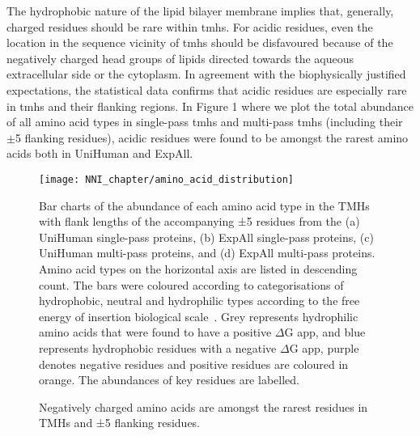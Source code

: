 The hydrophobic nature of the lipid bilayer membrane implies that, generally, charged residues should be rare within \gls{tmh}s. For acidic residues, even the location in the sequence vicinity of \gls{tmh}s should be disfavoured because of the negatively charged head groups of lipids directed towards the aqueous extracellular side or the cytoplasm. In agreement with the biophysically justified expectations, the statistical data confirms that acidic residues are especially rare in \gls{tmh}s and their flanking regions. In Figure 1 where we plot the total abundance of all amino acid types in single-pass \gls{tmh}s and multi-pass \gls{tmh}s (including their $\pm$5 flanking residues), acidic residues were found to be amongst the rarest amino acids both in UniHuman and ExpAll.

\begin{figure}[!ht]
\centering
\texttt{[image: NNI\_chapter/amino\_acid\_distribution]}
\caption{Negatively charged amino acids are amongst the rarest residues in TMHs and ±5 flanking residues.}

\medskip
\small
Bar charts of the abundance of each amino acid type in the TMHs with flank lengths of the accompanying ±5 residues from the (a) UniHuman single-pass proteins, (b) ExpAll single-pass proteins, (c) UniHuman multi-pass proteins, and (d) ExpAll multi-pass proteins. Amino acid types on the horizontal axis are listed in descending count. The bars were coloured according to categorisations of hydrophobic, neutral and hydrophilic types according to the free energy of insertion biological scale~\cite{Hessa2005}. Grey represents hydrophilic amino acids that were found to have a positive $\Delta$G app, and blue represents hydrophobic residues with a negative $\Delta$G app, purple denotes negative residues and positive residues are coloured in orange. The abundances of key residues are labelled.
\label{fig:amino_acid_distribution}
\end{figure}

